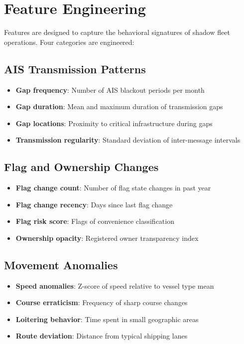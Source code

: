 \section{Feature Engineering}

Features are designed to capture the behavioral signatures of shadow fleet operations. Four categories are engineered:

\subsection{AIS Transmission Patterns}
\begin{itemize}
    \item \textbf{Gap frequency}: Number of AIS blackout periods per month
    \item \textbf{Gap duration}: Mean and maximum duration of transmission gaps
    \item \textbf{Gap locations}: Proximity to critical infrastructure during gaps
    \item \textbf{Transmission regularity}: Standard deviation of inter-message intervals
\end{itemize}

\subsection{Flag and Ownership Changes}
\begin{itemize}
    \item \textbf{Flag change count}: Number of flag state changes in past year
    \item \textbf{Flag change recency}: Days since last flag change
    \item \textbf{Flag risk score}: Flags of convenience classification
    \item \textbf{Ownership opacity}: Registered owner transparency index
\end{itemize}

\subsection{Movement Anomalies}
\begin{itemize}
    \item \textbf{Speed anomalies}: Z-score of speed relative to vessel type mean
    \item \textbf{Course erraticism}: Frequency of sharp course changes
    \item \textbf{Loitering behavior}: Time spent in small geographic areas
    \item \textbf{Route deviation}: Distance from typical shipping lanes
\end{itemize}

